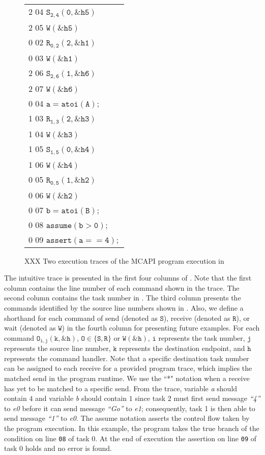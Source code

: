 \begin{figure}[h]
\begin{center}
\setlength{\tabcolsep}{2pt}
\scriptsize \begin{tabular}[t]{l}
2 04 $\mathtt{S_{2,4}(0,\&h5)}$ \\
2 05 $\mathtt{W(\&h5)}$\\
\hline
0 02 $\mathtt{R_{0,2}(2,\&h1)}$ \\
0 03 $\mathtt{W(\&h1)}$ \\
\hline
2 06 $\mathtt{S_{2,6}(1,\&h6)}$ \\
2 07 $\mathtt{W(\&h6)}$ \\
\hline
0 04 $\mathtt{a = atoi(A);}$ \\
\hline
1 03 $\mathtt{R_{1,3}(2,\&h3)}$ \\
1 04 $\mathtt{W(\&h3)}$ \\
1 05 $\mathtt{S_{1,5}(0,\&h4)}$ \\
1 06 $\mathtt{W(\&h4)}$ \\
\hline
0 05 $\mathtt{R_{0,5}(1,\&h2)}$ \\
0 06 $\mathtt{W(\&h2)}$ \\
0 07 $\mathtt{b = atoi(B);}$ \\
0 08 $\mathtt{assume (b > 0);}$ \\
0 09 $\mathtt{assert(a == 4);}$ \\
\end{tabular}
\end{center}
\caption{XXX Two execution traces of the MCAPI program execution in }
\label{fig:trace1}
\end{figure}

The intuitive trace is presented in the first four columns
of . Note that the first column contains the line
number of each command shown in the trace. The second column contains
the task number in . The third column presents the
commands identified by the source line numbers shown
in . Also, we define a shorthand for each command of
send (denoted as $\mathtt{S}$), receive (denoted as $\mathtt{R}$), or
wait (denoted as $\mathtt{W}$) in the fourth column for presenting
future examples. For each command $\mathtt{O_{i,j}(k,\&h)}$,
$\mathtt{O \in \{S,R\}}$ or $\mathtt{W(\&h)}$, $\mathtt{i}$ represents
the task number, $\mathtt{j}$ represents the source line number,
$\mathtt{k}$ represents the destination endpoint, and $\mathtt{h}$
represents the command handler. Note that a specific destination task
number can be assigned to each receive for a provided program trace,
which implies the matched send in the program runtime. We use the ``*"
notation when a receive has yet to be matched to a specific send. From
the trace, variable \textit{a} should contain $4$ and variable
\textit{b} should contain $1$ since task 2 must first send message \textit{``4''}
to \textit{e0} before it can send message \textit{``Go''} to \textit{e1};
consequently, task 1 is then able to send message \textit{``1''} to
\textit{e0}. The assume notation asserts the control flow taken by the program execution. In this example, the program takes the true branch of the condition on line \texttt{08} of task 0.  At the end of execution the assertion on line \texttt{09}
of task 0 holds and no error is found.

